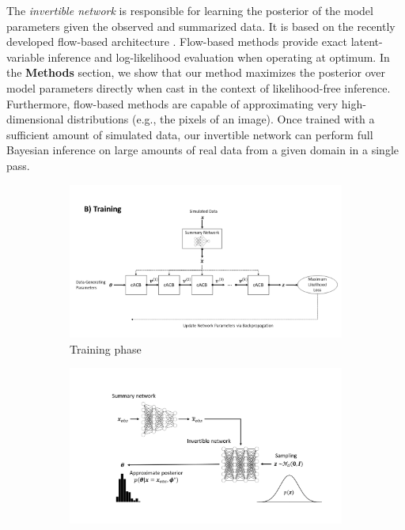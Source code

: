 \documentclass[9pt,twoside,lineno]{pnas-new}
\begin{document}
The \textit{invertible network} is responsible for learning the posterior of the model parameters given the observed and summarized data. It is based on the recently developed flow-based architecture \cite{kingma2018glow, grover2018flow, dinh2016density}. Flow-based methods provide exact latent-variable inference and log-likelihood evaluation when operating at optimum. In the \textbf{Methods} section, we show that our method maximizes the posterior over model parameters directly when cast in the context of likelihood-free inference. Furthermore, flow-based methods are capable of approximating very high-dimensional distributions (e.g., the pixels of an image). Once trained with a sufficient amount of simulated data, our invertible network can perform full Bayesian inference on large amounts of real data from a given domain in a single pass. 
\begin{figure}
  \begin{subfigure}[b]{0.49\textwidth}
    \includegraphics[width=\textwidth]{training.png}
    \caption{Training phase}
    \label{fig:Fig.1a}
  \end{subfigure}
  \begin{subfigure}[b]{0.49\textwidth}
    \includegraphics[width=\textwidth]{inference.png}

\end{subfigure}
\end{figure}
\end{document}

